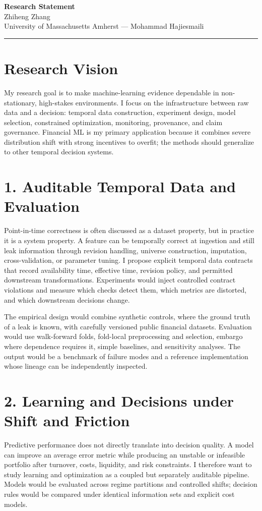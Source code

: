 \documentclass[11pt]{article}
\newcommand{\ApplicantName}{Zhiheng Zhang}
\begin{document}
\begin{center}
{\LARGE\bfseries Research Statement}\\[0.25em]
{\large \ApplicantName}\\
University of Massachusetts Amherst --- Mohammad Hajiesmaili
\end{center}
\vspace{0.35em}\hrule\vspace{0.65em}

\section*{Research Vision}
My research goal is to make machine-learning evidence dependable in non-stationary, high-stakes environments. I focus on the infrastructure between raw data and a decision: temporal data construction, experiment design, model selection, constrained optimization, monitoring, provenance, and claim governance. Financial ML is my primary application because it combines severe distribution shift with strong incentives to overfit; the methods should generalize to other temporal decision systems.

\section*{1. Auditable Temporal Data and Evaluation}
Point-in-time correctness is often discussed as a dataset property, but in practice it is a system property. A feature can be temporally correct at ingestion and still leak information through revision handling, universe construction, imputation, cross-validation, or parameter tuning. I propose explicit temporal data contracts that record availability time, effective time, revision policy, and permitted downstream transformations. Experiments would inject controlled contract violations and measure which checks detect them, which metrics are distorted, and which downstream decisions change.

The empirical design would combine synthetic controls, where the ground truth of a leak is known, with carefully versioned public financial datasets. Evaluation would use walk-forward folds, fold-local preprocessing and selection, embargo where dependence requires it, simple baselines, and sensitivity analyses. The output would be a benchmark of failure modes and a reference implementation whose lineage can be independently inspected.

\section*{2. Learning and Decisions under Shift and Friction}
Predictive performance does not directly translate into decision quality. A model can improve an average error metric while producing an unstable or infeasible portfolio after turnover, costs, liquidity, and risk constraints. I therefore want to study learning and optimization as a coupled but separately auditable pipeline. Models would be evaluated across regime partitions and controlled shifts; decision rules would be compared under identical information sets and explicit cost models.
\end{document}

